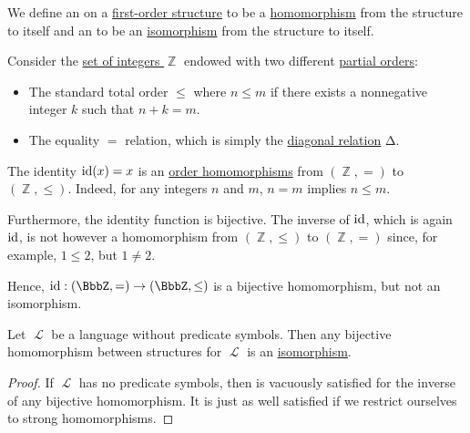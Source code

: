 \begin{definition}\label{def:first_order_automorphism}
  We define an  on a \hyperref[def:first_order_structure]{first-order structure} to be a \hyperref[def:first_order_homomorphism]{homomorphism} from the structure to itself and an  to be an \hyperref[def:first_order_isomorphism]{isomorphism} from the structure to itself.
\end{definition}

\begin{example}\label{ex:bijective_order_homomorphism_not_isomorphism}
  Consider the \hyperref[def:integers]{set of integers \( \BbbZ \)} endowed with two different \hyperref[def:partially_ordered_set]{partial orders}:
  \begin{itemize}
    \item The standard total order \( \leq \) where \( n \leq m \) if there exists a nonnegative integer \( k \) such that \( n + k = m \).
    \item The equality \( = \) relation, which is simply the \hyperref[def:binary_relation/diagonal]{diagonal relation} \( \increment \).
  \end{itemize}

  The identity \( \operatorname{id}(x) = x \) is an \hyperref[def:order_homomorphism]{order homomorphisms} from \( (\BbbZ, =) \) to \( (\BbbZ, \leq) \). Indeed, for any integers \( n \) and \( m \), \( n = m \) implies \( n \leq m \).

  Furthermore, the identity function is bijective. The inverse of \( \operatorname{id} \), which is again \( \operatorname{id} \), is not however a homomorphism from \( (\BbbZ, \leq) \) to \( (\BbbZ, =) \) since, for example, \( 1 \leq 2 \), but \( 1 \neq 2 \).

  Hence, \( \id: (\BbbZ, =) \to (\BbbZ, \leq) \) is a bijective homomorphism, but not an isomorphism.
\end{example}

\begin{proposition}\label{thm:automorphism_without_predicate_symbols}
  Let \( \mscrL \) be a language without predicate symbols. Then any bijective homomorphism between structures for \( \mscrL \) is an \hyperref[def:first_order_isomorphism]{isomorphism}.
\end{proposition}
\begin{proof}
  If \( \mscrL \) has no predicate symbols, then  is vacuously satisfied for the inverse of any bijective homomorphism. It is just as well satisfied if we restrict ourselves to strong homomorphisms.
\end{proof}

